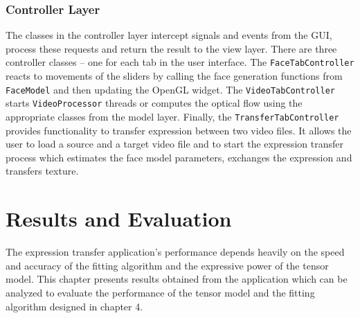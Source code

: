 \documentclass[11pt,a4paper]{report}
\begin{document}
\subsection{Controller Layer}
The classes in the controller layer intercept signals and events from the GUI,
process these requests and return the result to the view layer. There are three
controller classes -- one for each tab in the user interface. The
\texttt{FaceTabController} reacts to movements of the sliders by calling the
face generation functions from \texttt{FaceModel} and then updating the OpenGL
widget. The \texttt{VideoTabController} starts \texttt{VideoProcessor} threads
or computes the optical flow using the appropriate classes from the model
layer. Finally, the \texttt{TransferTabController} provides functionality to
transfer expression between two video files. It allows the user to load a source
and a target video file and to start the expression transfer process which
estimates the face model parameters, exchanges the expression and transfers
texture.


\chapter{Results and Evaluation}
The expression transfer application's performance depends heavily on the speed
and accuracy of the fitting algorithm and the expressive power of the tensor
model. This chapter presents results obtained from the application which can be
analyzed to evaluate the performance of the tensor model and the fitting
algorithm designed in chapter 4.
\end{document}
